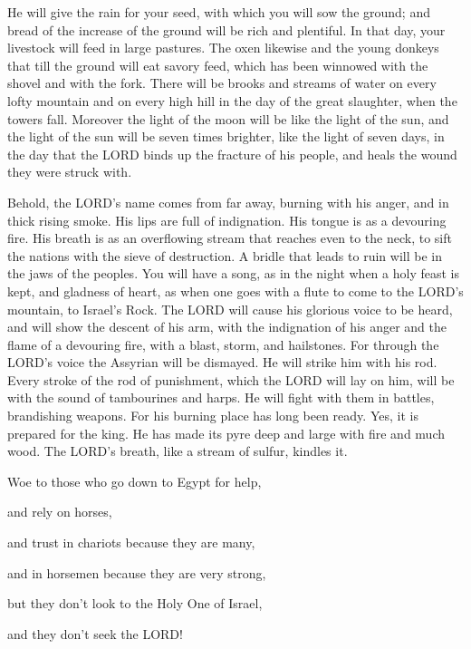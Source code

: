 \myverse{}He will give the rain for your seed, with which you will sow
the ground; and bread of the increase of the ground will be rich and plentiful. In that day, your livestock
will feed in large pastures.
\myverse{}The oxen likewise and the young donkeys that till the ground will eat savory
feed, which has been winnowed with the shovel and with the fork.
\myverse{}There will be brooks and streams of water on every lofty mountain and on
every high hill in the day of the great slaughter, when the towers fall.
\myverse{}Moreover the light of the moon will be like the light of the sun, and the
light of the sun will be seven times brighter, like the light of seven days, in the day that the LORD
binds up the fracture of his people, and heals the wound they were struck with.

\myverse{}Behold, the LORD’s name comes from far away, burning with his
anger, and in thick rising smoke. His lips are full of indignation. His tongue is as a devouring fire.
\myverse{}His breath is as an overflowing stream that reaches even to the neck, to
sift the nations with the sieve of destruction. A bridle that leads to ruin will be in the jaws of the
peoples.
\myverse{}You will have a song, as in the night when a holy feast is kept, and gladness
of heart, as when one goes with a flute to come to the LORD’s mountain, to Israel’s Rock.
\myverse{}The LORD will cause his glorious voice to be heard, and will show the descent
of his arm, with the indignation of his anger and the flame of a devouring fire, with a blast, storm,
and hailstones.
\myverse{}For through the LORD’s voice the Assyrian will be dismayed. He will strike
him with his rod.
\myverse{}Every stroke of the rod of punishment, which the LORD will lay on him, will
be with the sound of tambourines and harps. He will fight with them in battles, brandishing weapons.
\myverse{}For his burning place has long been ready. Yes, it is prepared for the king.
He has made its pyre deep and large with fire and much wood. The LORD’s breath, like a stream of sulfur,
kindles it.


\mychapter{} \myverse*{}Woe to those who go down to Egypt for help,

\quad\quad and rely on horses,

and trust in chariots because they are many,

and in horsemen because they are very strong,

but they don’t look to the Holy One of Israel,

and they don’t seek the LORD!

